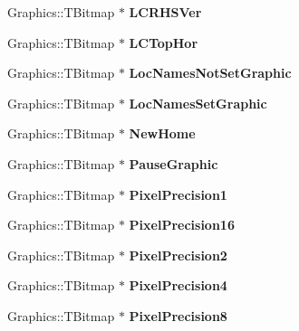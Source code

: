 \begin{DoxyCompactItemize}
Graphics\+::\+T\+Bitmap $\ast$ {\bfseries L\+C\+R\+H\+S\+Ver}
\item 
\mbox{\label{class_t_rail_graphics_ac5fe6c96e78e81a4d151e5100f77316a}} 
Graphics\+::\+T\+Bitmap $\ast$ {\bfseries L\+C\+Top\+Hor}
\item 
\mbox{\label{class_t_rail_graphics_a62a0c8446bca4ebeb0a1abf1dc90ae9c}} 
Graphics\+::\+T\+Bitmap $\ast$ {\bfseries Loc\+Names\+Not\+Set\+Graphic}
\item 
\mbox{\label{class_t_rail_graphics_a6fab43082505efd6c12d1dd2f8da6fd3}} 
Graphics\+::\+T\+Bitmap $\ast$ {\bfseries Loc\+Names\+Set\+Graphic}
\item 
\mbox{\label{class_t_rail_graphics_a301b40cd0acf0b410a0aff675348a529}} 
Graphics\+::\+T\+Bitmap $\ast$ {\bfseries New\+Home}
\item 
\mbox{\label{class_t_rail_graphics_a94b1822df5bb9c7d06a9c23b64afbeaa}} 
Graphics\+::\+T\+Bitmap $\ast$ {\bfseries Pause\+Graphic}
\item 
\mbox{\label{class_t_rail_graphics_abc3f2ffe7a0a0067971c92a1a86556fb}} 
Graphics\+::\+T\+Bitmap $\ast$ {\bfseries Pixel\+Precision1}
\item 
\mbox{\label{class_t_rail_graphics_a8cf32a783b4932619689080b6ebc5e65}} 
Graphics\+::\+T\+Bitmap $\ast$ {\bfseries Pixel\+Precision16}
\item 
\mbox{\label{class_t_rail_graphics_a25f34ec123429919d4e4dfabd85294b9}} 
Graphics\+::\+T\+Bitmap $\ast$ {\bfseries Pixel\+Precision2}
\item 
\mbox{\label{class_t_rail_graphics_ac50b46f50066fd5aa5434ea32ab0c0bc}} 
Graphics\+::\+T\+Bitmap $\ast$ {\bfseries Pixel\+Precision4}
\item 
\mbox{\label{class_t_rail_graphics_af65825a44aa6d0af742a1e6f4d1a55aa}} 
Graphics\+::\+T\+Bitmap $\ast$ {\bfseries Pixel\+Precision8}
\item 

\end{DoxyCompactItemize}
